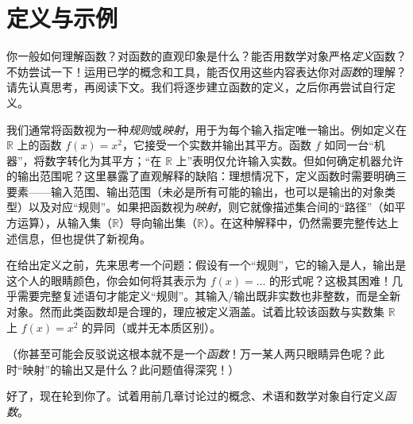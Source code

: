 \section{定义与示例}

你一般如何理解函数？对函数的直观印象是什么？能否用数学对象严格\emph{定义}函数？不妨尝试一下！运用已学的概念和工具，能否仅用这些内容表达你对\emph{函数}的理解？请先认真思考，再阅读下文。我们将逐步建立函数的定义，之后你再尝试自行定义。

我们通常将函数视为一种\emph{规则}或\emph{映射}，用于为每个输入指定唯一输出。例如定义在 $\mathbb{R}$ 上的函数 $f(x) = x^2$，它接受一个实数并输出其平方。函数 $f$ 如同一台``机器''，将数字转化为其平方；``在 $\mathbb{R}$ 上''表明仅允许输入实数。但如何确定机器允许的输出范围呢？这里暴露了直观解释的缺陷：理想情况下，定义函数时需要明确三要素——输入范围、输出范围（未必是所有可能的输出，也可以是输出的对象类型）以及对应``规则''。如果把函数视为\emph{映射}，则它就像描述集合间的``路径''（如平方运算），从输入集（$\mathbb{R}$）导向输出集（$\mathbb{R}$）。在这种解释中，仍然需要完整传达上述信息，但也提供了新视角。

在给出定义之前，先来思考一个问题：假设有一个``规则''，它的输入是人，输出是这个人的眼睛颜色，你会如何将其表示为 $f(x) = \dots$ 的形式呢？这极其困难！几乎需要完整复述语句才能定义``规则''。其输入/输出既非实数也非整数，而是全新对象。然而此类函数却是合理的，理应被定义涵盖。试着比较该函数与实数集 $\mathbb{R}$ 上 $f(x) = x^2$ 的异同（或并无本质区别）。

（你甚至可能会反驳说这根本就不是一个\emph{函数}！万一某人两只眼睛异色呢？此时``映射''的输出又是什么？此问题值得深究！）

好了，现在轮到你了。试着用前几章讨论过的概念、术语和数学对象自行定义\emph{函数}。










